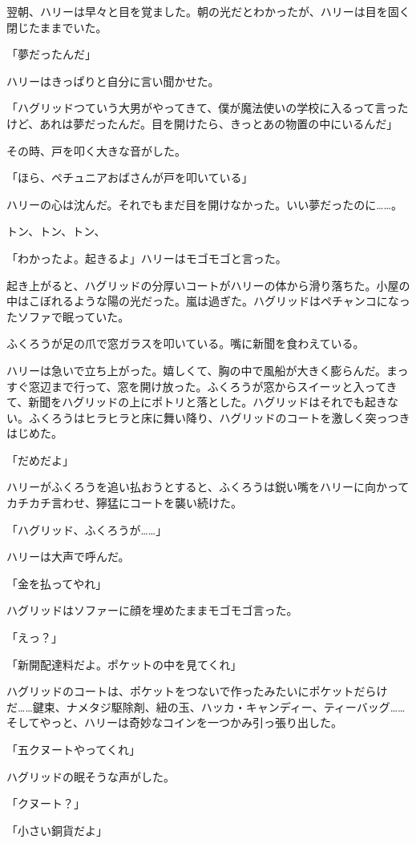 \documentclass[10pt,a4paper]{article}
\begin{document}
\begin{CJK}{UTF8}{min}
翌朝、ハリーは早々と目を覚ました。朝の光だとわかったが、ハリーは目を固く閉じたままでいた。

「夢だったんだ」

ハリーはきっぱりと自分に言い聞かせた。

「ハグリッドつていう大男がやってきて、僕が魔法使いの学校に入るって言ったけど、あれは夢だったんだ。目を開けたら、きっとあの物置の中にいるんだ」

その時、戸を叩く大きな音がした。

「ほら、ペチュニアおばさんが戸を叩いている」

ハリーの心は沈んだ。それでもまだ目を開けなかった。いい夢だったのに……。

トン、トン、トン、

「わかったよ。起きるよ」ハリーはモゴモゴと言った。

起き上がると、ハグリッドの分厚いコートがハリーの体から滑り落ちた。小屋の中はこぼれるような陽の光だった。嵐は過ぎた。ハグリッドはペチャンコになったソファで眠っていた。

ふくろうが足の爪で窓ガラスを叩いている。嘴に新聞を食わえている。

ハリーは急いで立ち上がった。嬉しくて、胸の中で風船が大きく膨らんだ。まっすぐ窓辺まで行って、窓を開け放った。ふくろうが窓からスイーッと入ってきて、新聞をハグリッドの上にポトリと落とした。ハグリッドはそれでも起きない。ふくろうはヒラヒラと床に舞い降り、ハグリッドのコートを激しく突っつきはじめた。

「だめだよ」

ハリーがふくろうを追い払おうとすると、ふくろうは鋭い嘴をハリーに向かってカチカチ言わせ、獰猛にコートを襲い続けた。

「ハグリッド、ふくろうが……」

ハリーは大声で呼んだ。

「金を払ってやれ」

ハグリッドはソファーに顔を埋めたままモゴモゴ言った。

「えっ？」

「新開配達料だよ。ポケットの中を見てくれ」

ハグリッドのコートは、ポケットをつないで作ったみたいにポケットだらけだ……鍵束、ナメタジ駆除剤、紐の玉、ハッカ・キャンディー、ティーバッグ……そしてやっと、ハリーは奇妙なコインを一つかみ引っ張り出した。

「五クヌートやってくれ」

ハグリッドの眠そうな声がした。

「クヌート？」

「小さい銅貨だよ」


\end{CJK}
\end{document}

